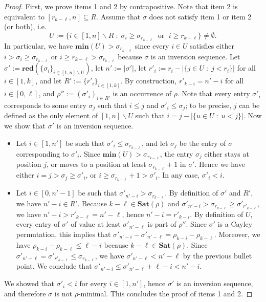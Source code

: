\documentclass[a4paper,11pt]{article}
\theoremstyle{definition}
\theoremstyle{remark}
\renewcommand{\min}{\mathbf{min}}
\newcommand{\Sat}{\mathbf{Sat}}
\newcommand{\red}{\mathbf{red}}
\begin{document}
\begin{proof}
    First, we prove items 1 and 2 by contrapositive. Note that item 2 is equivalent to $[r_{k-\ell}, n] \subseteq R$. Assume that $\sigma$ does not satisfy item 1 or item 2 (or both), i.e.
    $$U := \{i \in [1,n] \backslash R \; : \; \sigma_i \geq \sigma_{r_{k-\ell}} \; \text{ or } \; i \geq r_{k-\ell}\} \neq \emptyset.$$
    In particular, we have $\min(U) > \sigma_{r_{k-\ell}}$ since every $i \in U$ satisfies either ${i > \sigma_i \geq \sigma_{r_{k-\ell}}}$ or $i \geq r_{k-\ell} > \sigma_{r_{k-\ell}}$ because $\sigma$ is an inversion sequence.
    Let $\sigma' := \red(\{\sigma_i\}_{i \in [1,n] \backslash U})$, let $n' := |\sigma'|$, let ${r'_i := r_i - |\{j \in U \; : \; j < r_i\}|}$ for all ${i \in [1,k]}$, and let $R' := \{r'_i\}_{i \in [1,k]}$.
    By construction, $r'_{k-i} = n'-i$ for all $i \in [0,\ell]$, and $\rho'' := (\sigma'_i)_{i \in R'}$ is an occurrence of $\rho$. Note that every entry $\sigma'_i$ corresponds to some entry $\sigma_j$ such that $i \leq j$ and $\sigma'_i \leq \sigma_j$; to be precise, $j$ can be defined as the only element of $[1,n] \backslash U$ such that $i = j - |\{u \in U \; : \; u < j\}|$. Now we show that $\sigma'$ is an inversion sequence. 
    \begin{itemize}
        \item Let $i \in [1,n']$ be such that $\sigma'_i \leq \sigma_{r_{k-\ell}}$, and let $\sigma_j$ be the entry of $\sigma$ corresponding to $\sigma'_i$. Since $\min(U) > \sigma_{r_{k-\ell}}$, the entry $\sigma_j$ either stays at position $j$, or moves to a position at least $\sigma_{r_{k-\ell}}+1$ in $\sigma'$. Hence we have either $i = j > \sigma_j \geq \sigma'_i$, or $i \geq \sigma_{r_{k-\ell}}+1 > \sigma'_i$. In any case, $\sigma'_i < i$.
        \item  Let $i \in [0,n'-1]$ be such that $\sigma'_{n'-i} > \sigma_{r_{k-\ell}}$. By definition of $\sigma'$ and $R'$, we have ${n'-i \in R'}$. Because $k-\ell \in \Sat(\rho)$ and $\sigma'_{n'-i} > \sigma_{r_{k-\ell}} \geq \sigma'_{r'_{k-\ell}}$, we have ${n'-i > r'_{k-\ell} = n'-\ell}$, hence $n'-i = r'_{k-i}$.
        By definition of $U$, every entry of $\sigma'$ of value at least $\sigma'_{n'-\ell}$ is part of $\rho''$. Since $\sigma'$ is a Cayley permutation, this implies that ${\sigma'_{n'-i} - \sigma'_{n'-\ell} = \rho_{k-i} - \rho_{k-\ell}}$. Moreover, we have $\rho_{k - i} - \rho_{k-\ell} \leq \ell - i$ because ${k-\ell \in \Sat(\rho)}$.
        Since $\sigma'_{n'-\ell} = \sigma'_{r'_{k-\ell}} \leq \sigma_{r_{k-\ell}}$, we have $\sigma'_{n'-\ell} < n'-\ell$ by the previous bullet point. We conclude that $\sigma'_{n'-i} \leq \sigma'_{n'-\ell} + \ell - i < n'-i$.
    \end{itemize}
    We showed that $\sigma'_i < i$ for every $i \in [1,n']$, hence $\sigma'$ is an inversion sequence, and therefore $\sigma$ is not $\rho$-minimal. This concludes the proof of items 1 and 2.


\end{proof}
\end{document}
